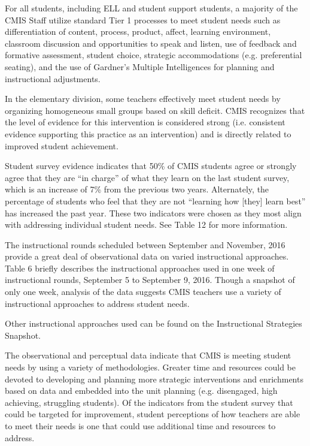 \documentclass{report}
\begin{document}
\begin{findings}

For all students, including ELL and student support students, a majority of the CMIS Staff utilize standard Tier 1 processes to meet student needs such as differentiation of content, process, product, affect, learning environment, classroom discussion and opportunities to speak and listen, use of feedback and formative assessment, student choice, strategic accommodations (e.g. preferential seating), and the use of  Gardner’s Multiple Intelligences for planning and instructional adjustments. 

In the elementary division, some teachers effectively meet student needs by organizing homogeneous small groups based on skill deficit. CMIS  recognizes that the level of evidence for this intervention is considered strong (i.e. consistent evidence supporting this practice as an intervention) and is directly related to improved student achievement. 


Student survey evidence indicates that 50\% of CMIS students agree or strongly agree that they are “in charge”  of what they learn on the last student survey, which is an increase of 7\% from the previous two years. Alternately, the percentage of students who feel that they are not “learning how [they] learn best” has increased the past year. These two indicators were chosen as they most align with addressing individual student needs. See Table 12 for more information. 


The instructional rounds scheduled between September and November, 2016 provide a great deal of observational data on varied instructional approaches. Table 6 briefly describes the instructional approaches used in one week of instructional rounds, September 5 to September 9, 2016. Though a snapshot of only one week, analysis of the data suggests CMIS teachers use a variety of instructional approaches to address student needs. 

Other instructional approaches used can be found on the Instructional Strategies Snapshot. 


The observational and perceptual data indicate that CMIS is meeting student needs by using a variety of methodologies. Greater time and resources could be devoted to developing and planning more strategic interventions and enrichments based on data and embedded into the unit planning (e.g. disengaged, high achieving, struggling students). Of the indicators from the student survey that could be targeted for improvement, student perceptions of how teachers are able to meet their needs is one that could use additional time and resources to address. 
\end{findings}
\end{document}
